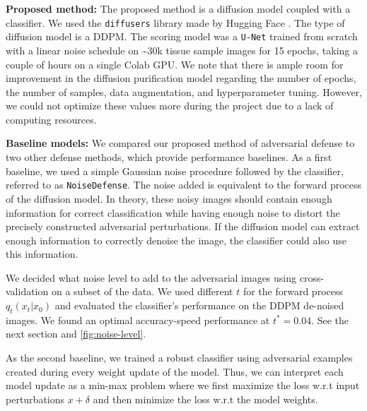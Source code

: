 \documentclass[twocolumn]{article}
\begin{document}
\textbf{Proposed method:}
The proposed method is a diffusion model coupled with a classifier. We used the \texttt{diffusers} library made by Hugging Face \cite{von-platen-etal-2022-diffusers}. The type of diffusion model is a DDPM. The scoring model was a \texttt{U-Net} trained from scratch with a linear noise schedule on \textasciitilde 30k tissue sample images for 15 epochs, taking a couple of hours on a single Colab GPU. We note that there is ample room for improvement in the diffusion purification model regarding the number of epochs, the number of samples, data augmentation, and hyperparameter tuning. However, we could not optimize these values more during the project due to a lack of computing resources.

\textbf{Baseline models:} We compared our proposed method of adversarial defense to two other defense methods, which provide performance baselines. As a first baseline, we used a simple Gaussian noise procedure followed by the classifier, referred to as \texttt{NoiseDefense}. The noise added is equivalent to the forward process of the diffusion model. In theory, these noisy images should contain enough information for correct classification while having enough noise to distort the precisely constructed adversarial perturbations. If the diffusion model can extract enough information to correctly denoise the image, the classifier could also use this information.

We decided what noise level to add to the adversarial images using cross-validation on a subset of the data. We used different $t$ for the forward process $q_t(x_t|x_0)$ and evaluated the classifier's performance on the DDPM de-noised images. We found an optimal accuracy-speed performance at $t^*=0.04$. See the next section and \autoref{fig:noise-level}.

As the second baseline, we trained a robust classifier using adversarial examples created during every weight update of the model. Thus, we can interpret each model update as a min-max problem where we first maximize the loss w.r.t input perturbations $x+\delta$ and then minimize the loss w.r.t the model weights.
\end{document}

